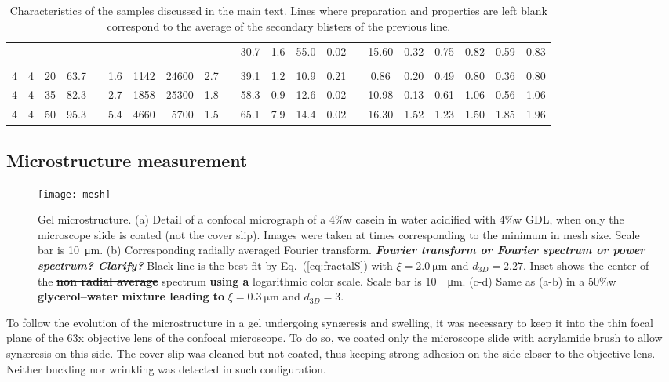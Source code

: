 \documentclass[twocolumn,superscriptaddress,showpacs,preprintnumbers,
amsmath,amssymb,prl]{revtex4-1}
\newcommand{\seb}[1]{\textbf{\color{blue}#1}} %
\newcommand{\sseb}[1]{\sout{\textbf{\color{blue}#1}}} %
\begin{document}
\begin{table*}
\begin{tabular}{SSSScSrrScSSSScSSSSSS}
& & & && & & & && 30.7 & 1.6 & 55.0 & 0.02 && 15.60 & 0.32 & 0.75 & 0.82 & 0.59 & 0.83 \\
   \\[-2ex]
4 & 4 & 20 & 63.7 && 1.6 & 1142 & 24600 & 2.7 && 39.1 & 1.2 & 10.9 & 0.21 && 0.86 & 0.20 & 0.49 & 0.80 & 0.36 & 0.80 \\ 
4 & 4 & 35 & 82.3 && 2.7 & 1858 & 25300 & 1.8 && 58.3 & 0.9 & 12.6 & 0.02 && 10.98 & 0.13 & 0.61 & 1.06 & 0.56 & 1.06 \\ 
4 & 4 & 50 & 95.3 && 5.4 & 4660 & 5700 & 1.5 && 65.1 & 7.9 & 14.4 & 0.02 && 16.30 & 1.52 & 1.23 & 1.50 & 1.85 & 1.96 \\ 
\end{tabular}
\caption{Characteristics of the samples discussed in the main text. Lines where preparation and properties are left blank correspond to the average of the secondary blisters of the previous line.}
\label{tab:data}
\end{table*}

\subsection*{Microstructure measurement}

\begin{figure}
	\texttt{[image: mesh]}
	\caption{Gel microstructure. (a) Detail of a confocal micrograph of a 4\%w casein in water acidified with 4\%w GDL, when only the microscope slide is coated (not the cover slip). Images were taken at times corresponding to the minimum in mesh size. Scale bar is \SI{10}{\micro\metre}. (b) Corresponding radially averaged Fourier transform. \seb{\it Fourier transform or Fourier spectrum or power spectrum? Clarify?} Black line is the best fit by Eq.~(\ref{eq:fractalS}) with $\xi=\SI{2.0}{\micro\metre}$ and $d_{3D}=2.27$. Inset shows the center of the \sseb{non radial average} spectrum \seb{using a} logarithmic color scale. Scale bar is \SI{10}{\per\micro\metre}. (c-d) Same as (a-b) in a 50\%w \seb{glycerol--water mixture leading to} $\xi=\SI{0.3}{\micro\metre}$ and $d_{3D}=3$.}
	\label{fig:mesh}
\end{figure}

To follow the evolution of the microstructure in a gel undergoing syn\ae{}resis and swelling, it was necessary to keep it into the thin focal plane of the 63x objective lens of the confocal microscope. To do so, we coated only the microscope slide with acrylamide brush to allow syn\ae{}resis on this side. The cover slip was cleaned but not coated, thus keeping strong adhesion on the side closer to the objective lens. Neither buckling nor wrinkling was detected in such configuration.
\end{document}
